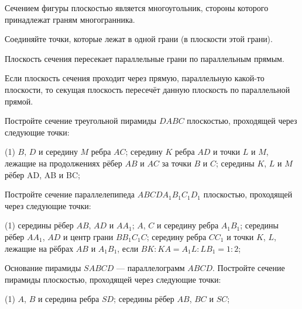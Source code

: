 %
%

\begin{class}[number=1]
	\begin{definit}
		Сечением фигуры плоскостью является многоугольник, стороны которого принадлежат граням многогранника.
	\end{definit}
	\begin{definit}
		Соединяйте точки, которые лежат в одной грани (в плоскости этой грани).
	\end{definit}
	\begin{definit}
		Плоскость сечения пересекает параллельные грани по параллельным прямым.
	\end{definit}
	\begin{definit}
		Если плоскость сечения проходит через прямую,
		параллельную какой-то плоскости, то секущая плоскость
		пересечёт данную плоскость по параллельной прямой.
	\end{definit}
	\begin{listofex}
		\item Постройте сечение треугольной пирамиды \( DABC \) плоскостью,
		проходящей через следующие точки:
		\begin{tasks}(1)
			\task \( B \), \( D \) и середину \( M \) ребра \( AC \);
			\task середину \( K \) ребра \( AD \) и точки \( L \) и \( M \), лежащие на продолжениях
			рёбер \( AB \) и \( AC \) за точки \( B \) и \( C \);
			\task середины \( K \), \( L \) и \( M \) рёбер AD, AB и BC;
		\end{tasks}
		\item Постройте сечение параллелепипеда \( ABCDA_1B_1C_1D_1 \)
		плоскостью, проходящей через следующие точки:
		\begin{tasks}(1)
			\task середины рёбер \( AB \), \( AD \) и \( AA_1 \);
			\task \( A \), \( C \) и середину ребра \( A_1B_1 \);
			\task середины рёбер \( AA_1 \), \( AD \) и центр грани \( BB_1C_1C \);
			\task середину ребра \( CC_1 \) и точки \( K \), \( L \), лежащие на рёбрах \( AB \) и \( A_1B_1 \),
			если \( BK : KA= A_1L : LB_1=1 : 2 \);
		\end{tasks}
		\item Основание пирамиды \( SABCD \) --- параллелограмм \( ABCD \).
		Постройте сечение пирамиды плоскостью, проходящей через следующие
		точки:
		\begin{tasks}(1)
			\task \( A \), \( B \) и середина ребра \( SD \);
			\task середины рёбер \( AB \), \( BC \) и \( SC \);

\end{tasks}
\end{listofex}
\end{class}
